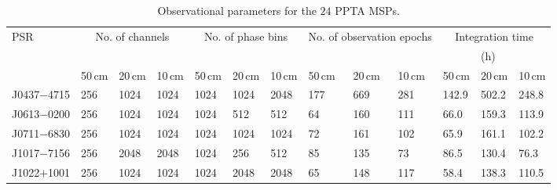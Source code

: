 \documentclass[useAMS,usenatbib]{mn2e}
\begin{document}
\begin{table}
\caption{Observational parameters for the $24$ PPTA MSPs.}
\label{obs}
\begin{center}
\begin{tabular}{p{1.5cm}p{0.9cm}<{\centering}p{0.9cm}<{\centering}p{0.9cm}<{\centering}p{0.9cm}<{\centering}p{0.9cm}<{\centering}p{0.9cm}<{\centering}p{0.9cm}<{\centering}p{0.9cm}<{\centering}p{0.9cm}<{\centering}p{0.9cm}<{\centering}p{0.9cm}<{\centering}p{0.9cm}<{\centering}}
\hline
PSR         &     \multicolumn{3}{c}{No. of channels}   &   \multicolumn{3}{c}{No. of phase bins}  &    \multicolumn{3}{c}{No. of observation epochs}   &    \multicolumn{3}{c}{Integration time}      \\
            &         &                 &          &         &             &          &         &             &          &         &   (h)            &       \\
            & 50\,cm &    20\,cm     & 10\,cm &  50\,cm &    20\,cm     & 10\,cm &  50\,cm &    20\,cm     & 10\,cm &  50\,cm &    20\,cm     & 10\,cm     \\
\hline
J0437$-$4715&  256    &    1024         &   1024   &  1024   &  1024       &  2048    &  177    &  669        & 281      &  142.9  &    502.2         &  248.8   \\
J0613$-$0200&  256    &    1024         &   1024   &  1024   &  512        &  512     &  64     &  160        & 111      &  66.0   &    159.3         &  113.9   \\
J0711$-$6830&  256    &    1024         &   1024   &  1024   &  1024       &  1024    &  72     &  161        & 102      &  65.9   &    161.1         &  102.2   \\
J1017$-$7156&  256    &    2048         &   2048   &  1024   &  256        &  512     &  85     &  135        & 73       &  86.5   &    130.4         &  76.3    \\
J1022$+$1001&  256    &    1024         &   1024   &  1024   &  2048       &  2048    &  65     &  148        & 117      &  58.4   &    138.3         &  110.5    \\

\end{tabular}
\end{center}
\end{table}
\end{document}
